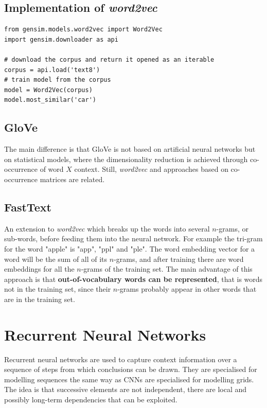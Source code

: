 \documentclass[11pt]{article}
\begin{document}
\subsection{Implementation of \emph{word2vec}}
\begin{verbatim}
from gensim.models.word2vec import Word2Vec
import gensim.downloader as api

# download the corpus and return it opened as an iterable
corpus = api.load('text8') 
# train model from the corpus
model = Word2Vec(corpus)
model.most_similar('car')
\end{verbatim}

\subsection{GloVe}
The main difference is that GloVe is not based on artificial neural networks but on statistical models, where the dimensionality reduction is achieved through co-occurrence of word $X$ context. Still, \emph{word2vec} and approaches based on co-occurrence matrices are related.

\subsection{FastText}
An extension to \emph{word2vec} which breaks up the words into several $n$-grams, or sub-words, before feeding them into the neural network. For example the tri-gram for the word "apple" is "app", "ppl" and "ple". The word embedding vector for a word will be the sum of all of its $n$-grams, and after training there are word embeddings for all the $n$-grams of the training set. The main advantage of this approach is that \textbf{out-of-vocabulary words can be represented}, that is words not in the training set, since their $n$-grams probably appear in other words that are in the training set.

\section{Recurrent Neural Networks}

Recurrent neural networks are used to capture context information over a sequence of steps from which conclusions can be drawn. They are specialised for modelling sequences the same way as CNNs are specialised for modelling grids. The idea is that successive elements are not independent, there are local and possibly long-term dependencies that can be exploited.
\end{document}
